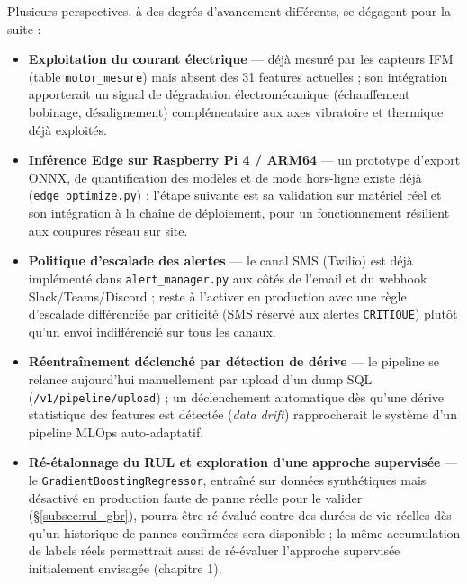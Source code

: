 \documentclass[12pt,a4paper]{report}
\begin{document}
Plusieurs perspectives, à des degrés d'avancement différents, se dégagent pour la
suite :

\begin{itemize}
  \item \textbf{Exploitation du courant électrique} — déjà mesuré par les capteurs
  IFM (table \texttt{motor\_mesure}) mais absent des 31 features actuelles ; son
  intégration apporterait un signal de dégradation électromécanique (échauffement
  bobinage, désalignement) complémentaire aux axes vibratoire et thermique déjà
  exploités.
  \item \textbf{Inférence Edge sur Raspberry Pi 4 / ARM64} — un prototype d'export
  ONNX, de quantification des modèles et de mode hors-ligne existe déjà
  (\texttt{edge\_optimize.py}) ; l'étape suivante est sa validation sur matériel réel
  et son intégration à la chaîne de déploiement, pour un fonctionnement résilient
  aux coupures réseau sur site.
  \item \textbf{Politique d'escalade des alertes} — le canal SMS (Twilio) est déjà
  implémenté dans \texttt{alert\_manager.py} aux côtés de l'email et du webhook
  Slack/Teams/Discord ; reste à l'activer en production avec une règle d'escalade
  différenciée par criticité (SMS réservé aux alertes \texttt{CRITIQUE}) plutôt
  qu'un envoi indifférencié sur tous les canaux.
  \item \textbf{Réentraînement déclenché par détection de dérive} — le pipeline se
  relance aujourd'hui manuellement par upload d'un dump SQL
  (\texttt{/v1/pipeline/upload}) ; un déclenchement automatique dès qu'une dérive
  statistique des features est détectée (\textit{data drift}) rapprocherait le
  système d'un pipeline MLOps auto-adaptatif.
  \item \textbf{Ré-étalonnage du RUL et exploration d'une approche supervisée} — le
  \texttt{GradientBoostingRegressor}, entraîné sur données synthétiques mais désactivé
  en production faute de panne réelle pour le valider (\S\ref{subsec:rul_gbr}), pourra
  être ré-évalué contre des durées de vie réelles dès qu'un historique de pannes
  confirmées sera disponible ; la même accumulation de labels réels permettrait aussi de
  ré-évaluer l'approche supervisée initialement envisagée (chapitre 1).
\end{itemize}
\end{document}

